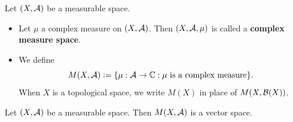 \documentclass{book}
\begin{document}
	\begin{defn}  
	Let $(X, \mathcal{A})$ be a measurable space. 
	\begin{itemize}
		\item Let $\mu$ a complex measure on $(X, \mathcal{A})$. Then $(X, \mathcal{A}, \mu)$ is called a \textbf{complex measure space}. 
		\item We define 
		$$M(X, \mathcal{A}) \vcentcolon= \{\mu:\mathcal{A} \rightarrow \mathbb{C}: \mu \text{ is a complex measure}\}.$$ 
		When $X$ is a topological space, we write $M(X)$ in place of $M(X, \mathcal{B}(X))$.
	\end{itemize}
	\end{defn}

	\begin{ex}  
		Let $(X, \mathcal{A})$ be a measurable space. Then $M(X, \mathcal{A})$ is a vector space.
	\end{ex}
\end{document}
